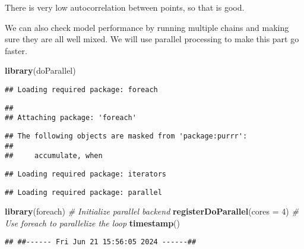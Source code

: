 \documentclass[
]{article}
\newenvironment{Shaded}{\begin{snugshade}}{\end{snugshade}}
\newcommand{\AttributeTok}[1]{\textcolor[rgb]{0.13,0.29,0.53}{#1}}
\newcommand{\CommentTok}[1]{\textcolor[rgb]{0.56,0.35,0.01}{\textit{#1}}}
\newcommand{\DecValTok}[1]{\textcolor[rgb]{0.00,0.00,0.81}{#1}}
\newcommand{\FunctionTok}[1]{\textcolor[rgb]{0.13,0.29,0.53}{\textbf{#1}}}
\newcommand{\NormalTok}[1]{#1}
\begin{document}
There is very low autocorrelation between points, so that is good.

We can also check model performance by running multiple chains and
making sure they are all well mixed. We will use parallel processing to
make this part go faster.

\begin{Shaded}
\begin{Highlighting}[]
\FunctionTok{library}\NormalTok{(doParallel)}
\end{Highlighting}
\end{Shaded}

\begin{verbatim}
## Loading required package: foreach
\end{verbatim}

\begin{verbatim}
## 
## Attaching package: 'foreach'
\end{verbatim}

\begin{verbatim}
## The following objects are masked from 'package:purrr':
## 
##     accumulate, when
\end{verbatim}

\begin{verbatim}
## Loading required package: iterators
\end{verbatim}

\begin{verbatim}
## Loading required package: parallel
\end{verbatim}

\begin{Shaded}
\begin{Highlighting}[]
\FunctionTok{library}\NormalTok{(foreach)}
\CommentTok{\# Initialize parallel backend}
\FunctionTok{registerDoParallel}\NormalTok{(}\AttributeTok{cores =} \DecValTok{4}\NormalTok{)}
\CommentTok{\# Use foreach to parallelize the loop}
\FunctionTok{timestamp}\NormalTok{()}
\end{Highlighting}
\end{Shaded}

\begin{verbatim}
## ##------ Fri Jun 21 15:56:05 2024 ------##
\end{verbatim}
\end{document}
